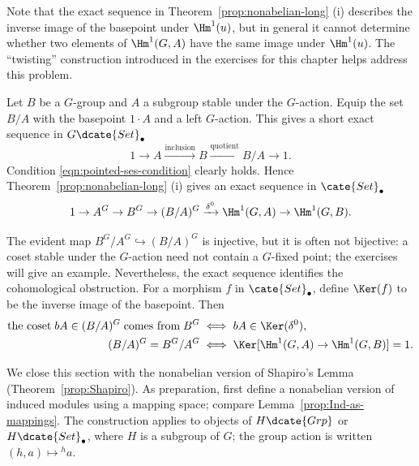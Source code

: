 Note that the exact sequence in Theorem~\ref{prop:nonabelian-long} (i)
describes the inverse image of the basepoint under $\Hm^1(u)$, but in
general it cannot determine whether two elements of $\Hm^1(G,A)$ have the
same image under $\Hm^1(u)$. The ``twisting'' construction introduced in
the exercises for this chapter helps address this problem.

\begin{example}
	Let $B$ be a $G$-group and $A$ a subgroup stable under the $G$-action.
	Equip the set $B/A$ with the basepoint $1\cdot A$ and a left $G$-action.
	This gives a short exact sequence in $G\dcate{Set}_\bullet$
	\[ 1 \to A \xrightarrow{\text{inclusion}} B \xrightarrow{\text{quotient}} B/A \to 1. \]
	Condition \eqref{eqn:pointed-ses-condition} clearly holds. Hence
	Theorem~\ref{prop:nonabelian-long} (i) gives an exact sequence in
	$\cate{Set}_\bullet$
	\[ 1 \to A^G \to B^G \to (B/A)^G \xrightarrow{\delta^0} \Hm^1(G, A) \to \Hm^1(G, B). \]

	The evident map $B^G/A^G\hookrightarrow(B/A)^G$ is injective, but it is
	often not bijective: a coset stable under the $G$-action need not contain
	a $G$-fixed point; the exercises will give an example. Nevertheless, the
	exact sequence identifies the cohomological obstruction. For a morphism
	$f$ in $\cate{Set}_\bullet$, define $\Ker(f)$ to be the inverse image of
	the basepoint. Then
	\begin{align*}
		\text{the coset}\; bA \in (B/A)^G \;\text{comes from}\; B^G & \iff bA \in \Ker(\delta^0), \\
		(B/A)^G = B^G/A^G & \iff \Ker[\Hm^1(G, A) \to \Hm^1(G, B)] = 1.
	\end{align*}
\end{example}

We close this section with the nonabelian version of Shapiro's Lemma
(Theorem~\ref{prop:Shapiro}). As preparation, first define a nonabelian
version of induced modules using a mapping space; compare
Lemma~\ref{prop:Ind-as-mappings}. The construction applies to objects of
$H\dcate{Grp}$ or $H\dcate{Set}_\bullet$, where $H$ is a subgroup of $G$;
the group action is written $(h,a)\mapsto{}^ha$.

